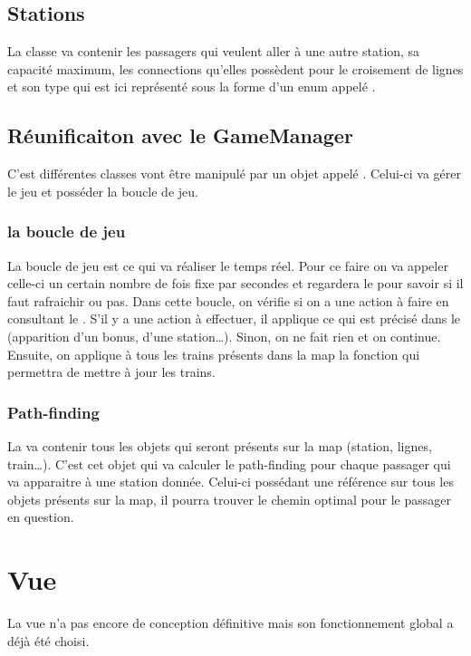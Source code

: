 \documentclass[report, backcover, french, nodocumentinfo]{upmethodology-document}
\begin{document}
			\subsection{Stations}
				La classe  va contenir les passagers qui veulent aller à une autre station, sa capacité maximum, les connections qu'elles possèdent pour le croisement de lignes et son type qui est ici représenté sous la forme d'un enum appelé .
			\subsection{Réunificaiton avec le GameManager}
				C'est différentes classes vont être manipulé par un objet appelé . Celui-ci va gérer le jeu et posséder la boucle de jeu.
				\subsubsection{la boucle de jeu}\label{gameLoop}
					La boucle de jeu est ce qui va réaliser le temps réel. Pour ce faire on va appeler celle-ci un certain nombre de fois fixe par secondes et regardera le  pour savoir si il faut rafraichir ou pas. Dans cette boucle, on vérifie si on a une action à faire en consultant le . S'il y a une action à effectuer, il applique ce qui est précisé dans le  (apparition d'un bonus, d'une station\ldots). Sinon, on ne fait rien et on continue. Ensuite, on applique à tous les trains présents dans la map la fonction  qui permettra de mettre à jour les trains.
				\subsubsection{Path-finding}
					La  va contenir tous les objets qui seront présents sur la map (station, lignes, train\ldots). C'est cet objet qui va calculer le path-finding pour chaque passager qui va apparaitre à une station donnée. Celui-ci possédant une référence sur tous les objets présents sur la map, il pourra trouver le chemin optimal pour le passager en question.
		\section{Vue}
			La vue n'a pas encore de conception définitive mais son fonctionnement global a déjà été choisi.
\end{document}

